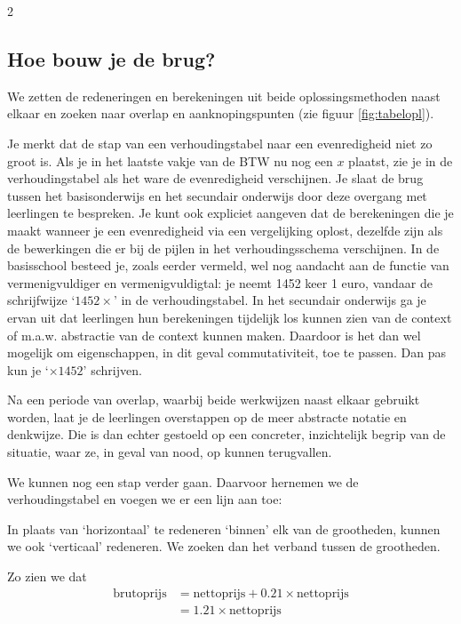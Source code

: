 \begin{multicols}{2}

\subsection{Hoe bouw je de brug?} 
We zetten de redeneringen en berekeningen uit beide oplossingsmethoden
naast elkaar en zoeken naar overlap en aanknopingspunten (zie figuur \autoref{fig:tabelopl}).

Je merkt dat de stap van een verhoudingstabel naar een evenredigheid niet zo groot is.
Als je in het laatste vakje van de BTW nu nog een \(x\) plaatst, zie je in de verhoudingstabel als het ware de evenredigheid verschijnen.
Je slaat de brug tussen het basisonderwijs en het secundair onderwijs door deze overgang met leerlingen te bespreken.
Je kunt ook expliciet aangeven dat de berekeningen die je maakt wanneer je een evenredigheid via een vergelijking oplost, dezelfde zijn als de bewerkingen die er bij de pijlen in het verhoudingsschema verschijnen.
In de basisschool besteed je, zoals eerder vermeld, wel nog aandacht aan de functie van vermenigvuldiger en vermenigvuldigtal: je neemt 1452 keer 1 euro, vandaar de schrijfwijze `\(1452 \times \)' in de verhoudingstabel.
In het secundair onderwijs ga je ervan uit dat leerlingen hun berekeningen tijdelijk los kunnen zien van de context of m.a.w. abstractie van de context kunnen maken.
Daardoor is het dan wel mogelijk om eigenschappen, in dit geval commutativiteit, toe te passen.
Dan pas kun je `\(\times 1452\)' schrijven.

Na een periode van overlap, waarbij beide werkwijzen naast elkaar gebruikt worden, laat je de leerlingen overstappen op de meer abstracte notatie en denkwijze.
Die is dan echter gestoeld op een concreter, inzichtelijk begrip van de situatie, waar ze, in geval van nood, op kunnen terugvallen.

We kunnen nog een stap verder gaan.
Daarvoor hernemen we de verhoudingstabel en voegen we er een lijn aan toe:



In plaats van `horizontaal' te redeneren `binnen' elk van de grootheden, kunnen we ook `verticaal' redeneren.
We zoeken dan het verband tussen de grootheden.

Zo zien we dat
\begin{align*}
    \text{brutoprijs} &=\text{nettoprijs} + \num{0.21} \times \text{nettoprijs}\\
    &= \num{1.21} \times \text{nettoprijs}
\end{align*}


\end{multicols}
